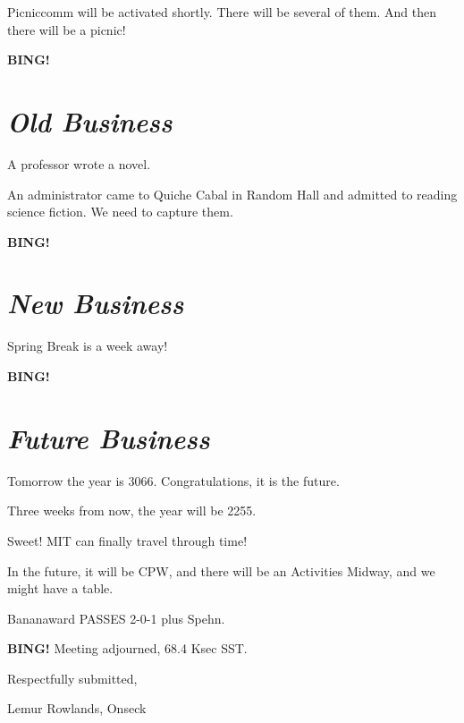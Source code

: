 \documentclass[10pt]{article}
\newcommand{\bing}{{\bf BING!} }
\newcommand{\goto}[1]{\bing \vskip 12pt \section*{{\em{#1}}}}
\newcommand{\ps}{ plus Spehn\xspace}
\newcommand{\onseck}{Lemur Rowlands, Onseck}
\begin{document}
Picniccomm will be activated shortly.  There will be several of them.  And
then there will be a picnic!

\goto{Old Business}

A professor wrote a novel.

An administrator came to Quiche Cabal in Random Hall and admitted to reading
science fiction.  We need to capture them.

\goto{New Business}

Spring Break is a week away!

\goto{Future Business}

Tomorrow the year is 3066.  Congratulations, it is the future.

Three weeks from now, the year will be 2255.

Sweet!  MIT can finally travel through time!

In the future, it will be CPW, and there will be an Activities
Midway, and we might have a table.

Bananaward PASSES 2-0-1\ps.

\bing
\noindent
Meeting adjourned, 68.4 Ksec SST.

\vspace{18pt}

\centerline{Respectfully submitted,}
\centerline{\onseck}
\end{document}
